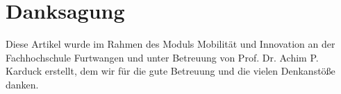 \section{Danksagung}
Diese Artikel wurde im Rahmen des Moduls \glqq Mobilität und Innovation\grqq{} an der Fachhochschule Furtwangen und unter Betreuung von Prof. Dr. Achim P. Karduck erstellt, dem wir für die gute Betreuung und die vielen Denkanstöße danken.